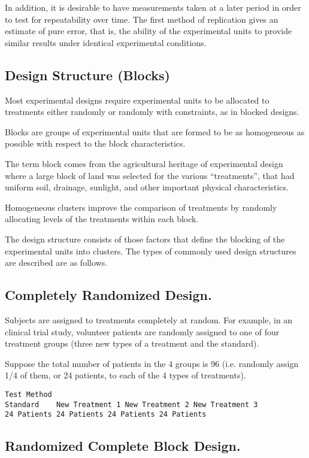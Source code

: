 \documentclass[a4paper,12pt]{article}
\begin{document}
In addition, it is desirable to have measurements taken at a later period in order to test for repeatability over time. The first method of replication gives an estimate of pure error, that is, the ability of the experimental units to provide similar results under identical experimental conditions. 


\subsection{Design Structure (Blocks)}
Most experimental designs require experimental units to be allocated to treatments either randomly or randomly with constraints, as in blocked designs.

Blocks are groups of experimental units that are formed to be as homogeneous as possible with respect to the block characteristics. 

The term block comes from the agricultural heritage of experimental design where a large block of land was selected for the various “treatments”, that had uniform soil, drainage, sunlight, and other important physical characteristics.

Homogeneous clusters improve the comparison of treatments by randomly allocating levels of the treatments within each block.

The design structure consists of those factors that define the blocking of the experimental units into clusters. The types of commonly used design structures are described are as follows.

\subsection{Completely Randomized Design.}

Subjects are assigned to treatments completely at random.
For example, in an clinical trial study, volunteer patients are randomly assigned to one of four treatment groups (three new types of a treatment and the standard). 

Suppose the total number of patients in the 4 groups is 96 (i.e. randomly assign 1/4 of them, or 24 patients, to each of the 4 types of treatments).

\begin{verbatim}
Test Method
Standard	New Treatment 1	New Treatment 2	New Treatment 3
24 Patients	24 Patients	24 Patients	24 Patients
\end{verbatim}
\subsection{Randomized Complete Block Design.}
\end{document}
